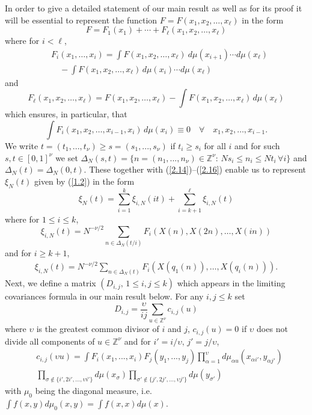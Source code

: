  In order to give a detailed statement of our main result as well as for its
proof it will be essential to represent the function $F= F(x_1,x_2,\ldots,
x_\ell)$ in the form 
\begin{equation}\label{2.14}
F=F_1(x_1)+\cdots+F_\ell(x_1, x_2,\ldots, x_\ell)
\end{equation}
where for $i<\ell$,
\begin{eqnarray}\label{2.15}
&F_i(x_1,\ldots, x_i)=\int F(x_1,x_2, \ldots, x_\ell)\ d\mu (x_{i+1})\cdots 
d\mu(x_\ell)\\
&\quad -\int F(x_1,x_2, \ldots, x_\ell) \,d\mu (x_i)\cdots d\mu(x_\ell)\nonumber
\end{eqnarray}
and
\[
F_\ell(x_1,x_2, \ldots, x_\ell)=F(x_1,x_2, \ldots, x_\ell) -\int F(x_1,x_2, 
\ldots, x_\ell)\, d\mu(x_\ell)
\]
which ensures, in particular, that
\begin{equation}\label{2.16}
\int F_i(x_1, x_2,\ldots,x_{i-1}, x_i)\,d\mu(x_i)\equiv 0 \quad\forall 
\quad x_1, x_2,\ldots, x_{i-1}.
\end{equation}
We write $t=(t_1,...,t_\nu)\geq s=(s_1,...,s_\nu)$ if $t_i\geq s_i$ for all $i$
and for such $s,t\in[0,1]^\nu$ we set ${{\Delta}}_N(s,t)=\{ n=(n_1,...,n_\nu)\in
{{\mathbb Z}}^\nu:\, Ns_i\leq n_i\leq Nt_i\,\forall i\}$ and ${{\Delta}}_N(t)={{\Delta}}_N(0,t)$.
These together with (\ref{2.14})--(\ref{2.16}) enable us to represent 
$\xi_N(t)$ given by (\ref{1.2}) in the form
\begin{equation}\label{2.17}
\xi_N(t)=\sum_{i=1}^k \xi_{i,N}(it)+\sum_{i=k+1}^\ell \xi_{i,N}(t)
\end{equation}
where for $1\leq i\leq k$,
\begin{equation}\label{2.18}
\xi_{i,N}(t)= N^{-\nu/2}\sum_{n\in{{\Delta}}_N(t/i)} F_i(X(n), X(2n),\ldots, X(in))
\end{equation}
and for $i\ge k+1$,
\begin{align}\label{2.19}
\xi_{i,N}(t)=N^{-\nu/2}\sum_{n\in{{\Delta}}_N(t)}  F_i(X(q_1(n)),\ldots,
 X(q_i(n))).
\end{align}
Next, we define a matrix $(D_{i,j},\, 1\leq i,j\leq k)$ which appears in the limiting
covariances formula in our main result below. For any $i,j\leq k$ set
\begin{equation}\label{2.19+}
D_{i,j}=\frac {{\upsilon}}{ij}\sum_{u\in{{\mathbb Z}}^\nu} c_{i,j}(u)
\end{equation}
where ${{\upsilon}}$ is the greatest common divisor of $i$ and $j$, $c_{i,j}(u)=0$ if ${{\upsilon}}$
does not divide all components of $u\in{{\mathbb Z}}^\nu$ and for $i'=i/{{\upsilon}},\, j'=j/{{\upsilon}}$,
\begin{eqnarray}\label{2.19++}
&c_{i,j}({{\upsilon}} u)=\int F_i(x_1,...,x_i)F_j(y_1,...,y_j)\prod_{{{\alpha}}=1}^{{\upsilon}} 
d\mu_{{{\alpha}} u}(x_{{{\alpha}} i'},y_{{{\alpha}} j'})\\
&\prod_{\sigma\notin \{i',2i',\ldots,{{\upsilon}} i'\}} d\mu(x_\sigma)
\prod_{\sigma'\notin \{j',2j',\ldots,{{\upsilon}} j'\}}d\mu(y_{\sigma'})\nonumber
\end{eqnarray}
with $\mu_0$ being the diagonal measure, i.e. $\int f(x,y)d\mu_0(x,y)=\int f(x,x)d\mu(x)$. 

